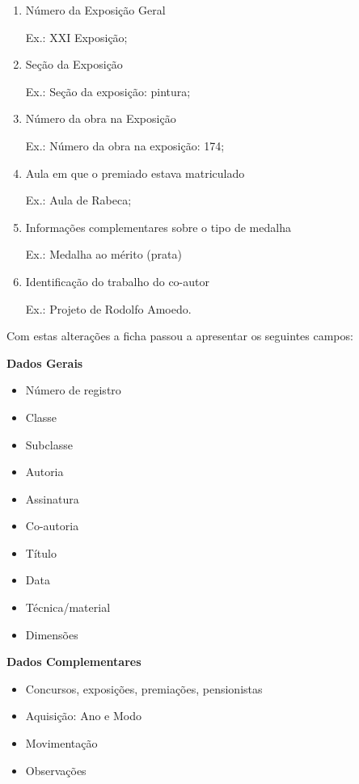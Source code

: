 \begin{enumerate}
	\item Número da Exposição Geral
	
	Ex.: XXI Exposição;
	
	\item Seção da Exposição
	
	Ex.: Seção da exposição: pintura;
	
	\item Número da obra na Exposição
	
	Ex.: Número da obra na exposição: 174;
	
	\item Aula em que o premiado estava matriculado
	
	Ex.: Aula de Rabeca;
	
	\item Informações complementares sobre o tipo de medalha
	
	Ex.: Medalha ao mérito (prata)
	
	\item Identificação do trabalho do co-autor
	
	Ex.: Projeto de Rodolfo Amoedo.
\end{enumerate}

Com estas alterações a ficha passou a apresentar os seguintes campos:


\textbf{Dados Gerais}
\begin{itemize}
	\item Número de registro
	\item Classe
	\item Subclasse
	\item Autoria
	\item Assinatura
	\item Co-autoria
	\item Título
	\item Data
	\item Técnica/material
	\item Dimensões
\end{itemize}


\textbf{Dados Complementares}
\begin{itemize}
	
	\item Concursos, exposições, premiações, pensionistas
	\item Aquisição: Ano e Modo
	\item Movimentação
	\item Observações
\end{itemize}

